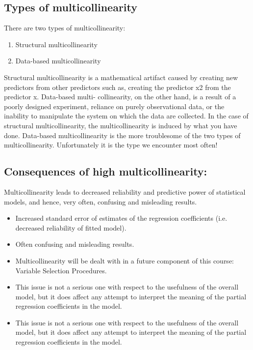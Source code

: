 \documentclass[a4paper,12pt]{article}
\begin{document}
\subsection{Types of multicollinearity}
There are two types of multicollinearity:
\begin{enumerate}
\item Structural multicollinearity
\item Data-based multicollinearity
\end{enumerate}
Structural multicollinearity is a mathematical artifact caused by creating new predictors from
other predictors such as, creating the predictor x2 from the predictor x. Data-based multi-
collinearity, on the other hand, is a result of a poorly designed experiment, reliance on purely
observational data, or the inability to manipulate the system on which the data are collected.
In the case of structural multicollinearity, the multicollinearity is induced by what you have
done. Data-based multicollinearity is the more troublesome of the two types of multicollinearity.
Unfortunately it is the type we encounter most often!

\subsection{Consequences of high multicollinearity:}
Multicollinearity leads to decreased reliability and predictive power of statistical models, and hence, very
often, confusing and misleading results.

\begin{itemize}
	\item Increased standard error of estimates of the regression coefficients (i.e. decreased reliability of fitted
	model).
	\item Often confusing and misleading results.
	\item Multicollinearity will be dealt with in a future component of this course: Variable Selection Procedures.
	\item This issue is not a serious one with respect to the
	usefulness of the overall model, but it does affect any attempt to interpret the meaning of the partial regression
	coefficients in the model.
	\item  This issue is not a serious one with respect to the usefulness of the overall model, but it does affect any attempt to interpret the meaning of the partial regression coefficients in the model.

\end{itemize}
\end{document}
